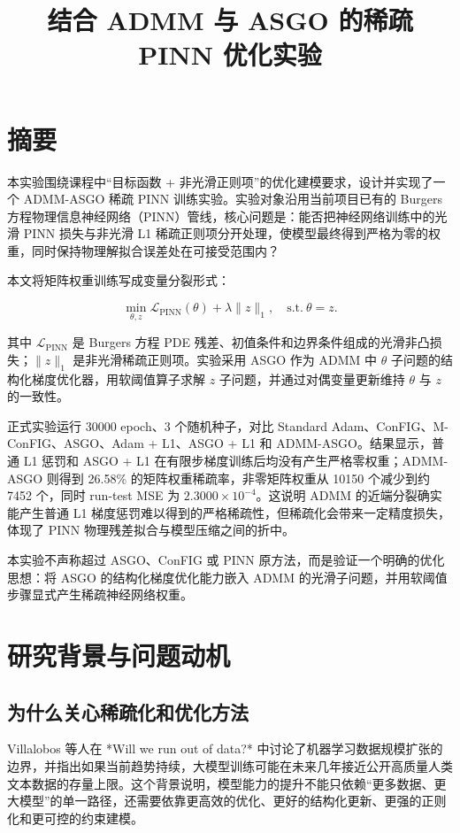 \documentclass[UTF8,a4paper,12pt,fontset=none]{ctexart}
\title{结合 ADMM 与 ASGO 的稀疏 PINN 优化实验}
\author{}
\date{}
\begin{document}
\maketitle
\tableofcontents
\newpage


\section{摘要}

本实验围绕课程中“目标函数 + 非光滑正则项”的优化建模要求，设计并实现了一个 ADMM-ASGO 稀疏 PINN 训练实验。实验对象沿用当前项目已有的 Burgers 方程物理信息神经网络（PINN）管线，核心问题是：能否把神经网络训练中的光滑 PINN 损失与非光滑 L1 稀疏正则项分开处理，使模型最终得到严格为零的权重，同时保持物理解拟合误差处在可接受范围内？

本文将矩阵权重训练写成变量分裂形式：

\[
\min_{\theta,z}\mathcal L_{\mathrm{PINN}}(\theta)+\lambda\|z\|_1,\quad \mathrm{s.t.}\ \theta=z.
\]

其中 $\mathcal L_{\mathrm{PINN}}$ 是 Burgers 方程 PDE 残差、初值条件和边界条件组成的光滑非凸损失；$\|z\|_1$ 是非光滑稀疏正则项。实验采用 ASGO 作为 ADMM 中 $\theta$ 子问题的结构化梯度优化器，用软阈值算子求解 $z$ 子问题，并通过对偶变量更新维持 $\theta$ 与 $z$ 的一致性。

正式实验运行 30000 epoch、3 个随机种子，对比 Standard Adam、ConFIG、M-ConFIG、ASGO、Adam + L1、ASGO + L1 和 ADMM-ASGO。结果显示，普通 L1 惩罚和 ASGO + L1 在有限步梯度训练后均没有产生严格零权重；ADMM-ASGO 则得到 26.58\% 的矩阵权重稀疏率，非零矩阵权重从 10150 个减少到约 7452 个，同时 run-test MSE 为 $2.3000\times 10^{-4}$。这说明 ADMM 的近端分裂确实能产生普通 L1 梯度惩罚难以得到的严格稀疏性，但稀疏化会带来一定精度损失，体现了 PINN 物理残差拟合与模型压缩之间的折中。

本实验不声称超过 ASGO、ConFIG 或 PINN 原方法，而是验证一个明确的优化思想：将 ASGO 的结构化梯度优化能力嵌入 ADMM 的光滑子问题，并用软阈值步骤显式产生稀疏神经网络权重。

\section{研究背景与问题动机}

\subsection{为什么关心稀疏化和优化方法}

Villalobos 等人在 *Will we run out of data?* 中讨论了机器学习数据规模扩张的边界，并指出如果当前趋势持续，大模型训练可能在未来几年接近公开高质量人类文本数据的存量上限。这个背景说明，模型能力的提升不能只依赖“更多数据、更大模型”的单一路径，还需要依靠更高效的优化、更好的结构化更新、更强的正则化和更可控的约束建模。
\end{document}
